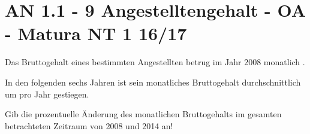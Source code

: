 \section{AN 1.1 - 9 Angestelltengehalt - OA - Matura NT 1 16/17}

\begin{beispiel}[AN 1.1]{1} %
Das Bruttogehalt eines bestimmten Angestellten betrug im Jahr 2008 monatlich .

In den folgenden sechs Jahren ist sein monatliches Bruttogehalt durchschnittlich um  pro Jahr gestiegen.

Gib die prozentuelle Änderung des monatlichen Bruttogehalts im gesamten betrachteten Zeitraum von 2008 und 2014 an!


\end{beispiel}